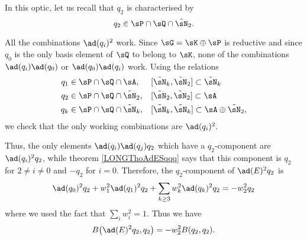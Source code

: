 In this optic, let us recall that $q_2$ is characterised by
\begin{equation}
    q_2\in\sP\cap\sQ\cap\tilde\sN_2.
\end{equation}

All the combinations $\ad(q_i)^2$ work. Since $\sG=\sK\oplus\sP$ is reductive and since $q_0$ is the only basis element of $\sQ$ to belong to $\sK$, none of the combinations $\ad(q_i)\ad(q_0)$ or $\ad(q_0)\ad(q_i)$ work. Using the relations
%
\begin{equation}
    \begin{aligned}[]
        q_1&\in\sP\cap\sQ\cap\sA    ,    &&    [\tilde\sN_k,\tilde\sN_2]\subset\tilde\sN_k\\
        q_2&\in\sP\cap\sQ\cap\tilde\sN_2,    &&    [\tilde\sN_2,\tilde\sN_2]\subset\sA\\
        q_k&\in\sP\cap\sQ\cap\tilde\sN_k,    &&    [\tilde\sN_k,\tilde\sN_k]\subset\sA\oplus\tilde\sN_2,
    \end{aligned}
\end{equation}%
%
we check that the only working combinations are $\ad(q_i)^2$.

%

%

%

%

Thus, the only elements $\ad(q_i)\ad(q_j)q_2$ which have a $q_2$-component are $\ad(q_i)^2q_2$, while theorem \ref{LONGThoAdESqqq} says that this component is $q_2$ for $2\neq i\neq 0$ and $-q_2$ for $i=0$. Therefore, the $q_2$-component of $\ad(E)^2q_2$ is
\begin{equation}
    \ad(q_0)^2q_2+w_1^2\ad(q_1)^2q_2+\sum_{k\geq 3}w_k^2\ad(q_k)^2q_2=-w_2^2q_2
\end{equation}
where we used the fact that $\sum_i w_i^2=1$. Thus we have
\begin{equation}        \label{LONGEqBeDeuxqqwDeux}
    B\big( \ad(E)^2q_2,q_2 \big)=-w_2^2B(q_2,q_2).
\end{equation}

